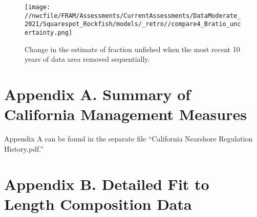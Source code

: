 \documentclass[11pt,
  english,
  a4paper,
]{article}
\begin{document}
\tagmcend\tagstructend


\begin{figure}
\centering
\texttt{[image: //nwcfile/FRAM/Assessments/CurrentAssessments/DataModerate\_2021/Squarespot\_Rockfish/models/\_retro//compare4\_Bratio\_uncertainty.png]}
\caption{Change in the estimate of fraction unfished when the most recent 10 years of data area removed sequentially.\label{fig:retro-depl}}
\end{figure}

\tagmcend\tagstructend

\newpage

\clearpage


\hypertarget{appendix-a.-summary-of-california-management-measures}{%
\section{Appendix A. Summary of California Management Measures}\label{appendix-a.-summary-of-california-management-measures}}

\leavevmode\tagmcend\tagstructend


Appendix A can be found in the separate file ``California Nearshore Regulation History.pdf.''

\leavevmode\tagmcend\tagstructend\par


\hypertarget{appendix-b.-detailed-fit-to-length-composition-data}{%
\section{Appendix B. Detailed Fit to Length Composition Data}\label{appendix-b.-detailed-fit-to-length-composition-data}}

\leavevmode\tagmcend\tagstructend

\end{document}
